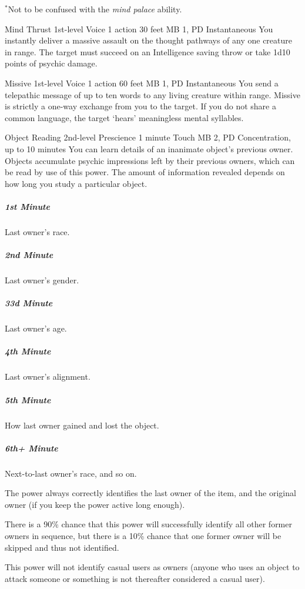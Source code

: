   $^*$Not to be confused with the \emph{mind palace} ability.

\DndPowerHeader%
  {Mind Thrust}
  {1st-level Voice}
  {1 action}
  {30 feet}
  {MB 1, PD \lvlone}
  {Instantaneous}
You instantly deliver a massive assault on the thought pathways
of any one creature in range.
The target must succeed on an Intelligence saving throw
or take 1d10 points of psychic damage.

\DndPowerHeader%
  {Missive}
  {1st-level Voice}
  {1 action}
  {60 feet}
  {MB 1, PD \lvlone}
  {Instantaneous}
  You send a telepathic message of up to ten words to
  any living creature within range.
  Missive is strictly a one-way exchange from you to the target.
  If you do not share a common language,
  the target `hears' meaningless mental syllables.

\DndPowerHeader%
  {Object Reading}
  {2nd-level Prescience}
  {1 minute}
  {Touch}
  {MB 2, PD \lvltwo}
  {Concentration, up to 10 minutes}
  You can learn details of an inanimate object's previous owner.
  Objects accumulate psychic impressions
  left by their previous owners,
  which can be read by use of this power.
  The amount of information revealed depends
  on how long you study a particular object.

  \subparagraph{1st Minute}
    Last owner's race.
  \subparagraph{2nd Minute}
    Last owner's gender.
  \subparagraph{33d Minute}
    Last owner's age.
  \subparagraph{4th Minute}
    Last owner's alignment.
  \subparagraph{5th Minute}
    How last owner gained and lost the object.
  \subparagraph{6th+ Minute}
    Next-to-last owner's race, and so on.
  
  The power always correctly identifies the last owner of the item,
  and the original owner
  (if you keep the power active long enough).
  
  There is a 90\% chance
  that this power will successfully identify all other former owners
  in sequence,
  but there is a 10\% chance that one former owner
  will be skipped and thus not identified.
  
  This power will not identify casual users as owners
  (anyone who uses an object to attack someone
  or something is not thereafter considered a casual user).
  
